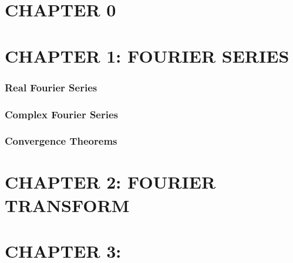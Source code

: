 \documentclass[a4paper]{article}
\begin{document}
\fontsize{7.5}{6}
\selectfont
\begin{multicols}{2}
\section*{CHAPTER 0}





\section*{CHAPTER 1: FOURIER SERIES}
\subsubsection*{Real Fourier Series}


\subsubsection*{Complex Fourier Series}

\subsubsection*{Convergence Theorems}








\section*{CHAPTER 2: FOURIER TRANSFORM}


\section*{CHAPTER 3: }




\end{multicols}
\end{document}
